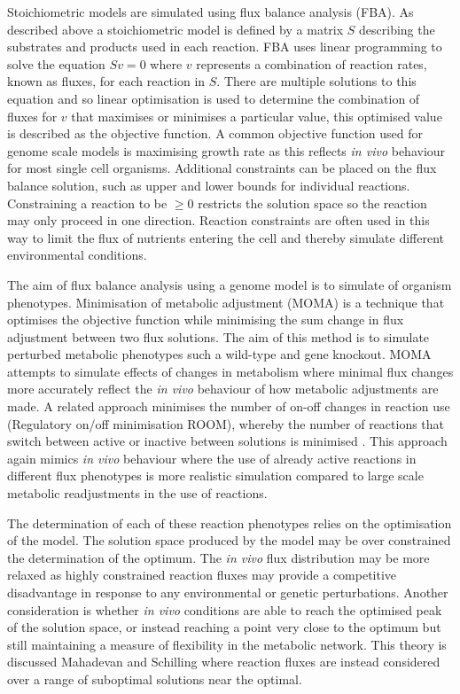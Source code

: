 Stoichiometric models are simulated using flux balance analysis (FBA). As described above a stoichiometric model is defined by a matrix $S$ describing the substrates and products used in each reaction. FBA uses linear programming to solve the equation $S v = 0$ where $v$ represents a combination of reaction rates, known as fluxes, for each reaction in $S$. There are multiple solutions to this equation and so linear optimisation is used to determine the combination of fluxes for $v$ that maximises or minimises a particular value, this optimised value is described as the objective function. A common objective function used for genome scale models is maximising growth rate as this reflects \emph{in vivo} behaviour for most single cell organisms. Additional constraints can be placed on the flux balance solution, such as upper and lower bounds for individual reactions. Constraining a reaction to be $\geq 0$ restricts the solution space so the reaction may only proceed in one direction. Reaction constraints are often used in this way to limit the flux of nutrients entering the cell and thereby simulate different environmental conditions.

The aim of flux balance analysis using a genome model is to simulate of organism phenotypes. Minimisation of metabolic adjustment (MOMA) \cite{segre2002,burgard2003} is a technique that optimises the objective function while minimising the sum change in flux adjustment between two flux solutions. The aim of this method is to simulate perturbed metabolic phenotypes such a wild-type and gene knockout. MOMA attempts to simulate effects of changes in metabolism where minimal flux changes more accurately reflect the \emph{in vivo} behaviour of how metabolic adjustments are made. A related approach minimises the number of on-off changes in reaction use (Regulatory on/off minimisation ROOM), whereby the number of reactions that switch between active or inactive between solutions is minimised \cite{shlomi2005}. This approach again mimics \emph{in vivo} behaviour where the use of already active reactions in different flux phenotypes is more realistic simulation compared to large scale metabolic readjustments in the use of reactions.

The determination of each of these reaction phenotypes relies on the optimisation of the model. The solution space produced by the model may be over constrained the determination of the optimum. The \emph{in vivo} flux distribution may be more relaxed as highly constrained reaction fluxes may provide a competitive disadvantage in response to any environmental or genetic perturbations. Another consideration is whether \emph{in vivo} conditions are able to reach the optimised peak of the solution space, or instead reaching a point very close to the optimum but still maintaining a measure of flexibility in the metabolic network. This theory is discussed Mahadevan and Schilling \cite{mahadevan2003} where reaction fluxes are instead considered over a range of suboptimal solutions near the optimal.

